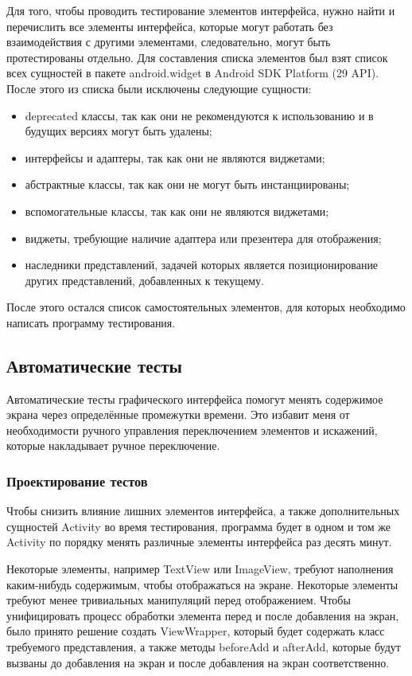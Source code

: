 \documentclass[a4paper,14pt]{extarticle} %
\begin{document}
	Для того, чтобы проводить тестирование элементов интерфейса, нужно найти и перечислить все элементы интерфейса, которые могут работать без взаимодействия с другими элементами, следовательно, могут быть протестированы отдельно. Для составления списка элементов был взят список всех сущностей в пакете android.widget в Android SDK Platform (29 API). После этого из списка были исключены следующие сущности:
	\begin{itemize}
		\item deprecated классы, так как они не рекомендуются к использованию и в будущих версиях могут быть удалены;
		\item интерфейсы и адаптеры, так как они не являются виджетами;
		\item абстрактные классы, так как они не могут быть инстанциированы;
		\item вспомогательные классы, так как они не являются виджетами;
		\item виджеты, требующие наличие адаптера или презентера для отображения;
		\item наследники представлений, задачей которых является позиционирование других представлений, добавленных к текущему.
	\end{itemize}
	
	После этого остался список самостоятельных элементов, для которых необходимо написать программу тестирования.
	
	\subsection{Автоматические тесты}
	
	Автоматические тесты графического интерфейса помогут менять содержимое экрана через определённые промежутки времени. Это избавит меня от необходимости ручного управления переключением элементов и искажений, которые накладывает ручное переключение.
	
	\subsubsection{Проектирование тестов}
	
	Чтобы снизить влияние лишних элементов интерфейса, а также дополнительных сущностей Activity во время тестирования, программа будет в одном и том же Activity по порядку менять различные элементы интерфейса раз десять минут.
	
	Некоторые элементы, например TextView или ImageView, требуют наполнения каким-нибудь содержимым, чтобы отображаться на экране. Некоторые элементы требуют менее тривиальных манипуляций перед отображением. Чтобы унифицировать процесс обработки элемента перед и после добавления на экран, было принято решение создать ViewWrapper, который будет содержать класс требуемого представления, а также методы beforeAdd и afterAdd, которые будут вызваны до добавления на экран и после добавления на экран соответственно. 
	
\end{document}
